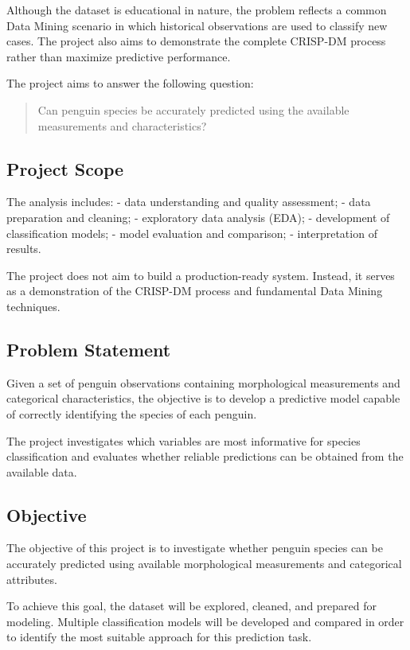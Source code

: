 \documentclass[
]{article}
\begin{document}
Although the dataset is educational in nature, the problem reflects a
common Data Mining scenario in which historical observations are used to
classify new cases. The project also aims to demonstrate the complete
CRISP-DM process rather than maximize predictive performance.

The project aims to answer the following question:

\begin{quote}
Can penguin species be accurately predicted using the available
measurements and characteristics?
\end{quote}

\subsection{Project Scope}\label{project-scope}

The analysis includes: - data understanding and quality assessment; -
data preparation and cleaning; - exploratory data analysis (EDA); -
development of classification models; - model evaluation and comparison;
- interpretation of results.

The project does not aim to build a production-ready system. Instead, it
serves as a demonstration of the CRISP-DM process and fundamental Data
Mining techniques.

\subsection{Problem Statement}\label{problem-statement}

Given a set of penguin observations containing morphological
measurements and categorical characteristics, the objective is to
develop a predictive model capable of correctly identifying the species
of each penguin.

The project investigates which variables are most informative for
species classification and evaluates whether reliable predictions can be
obtained from the available data.

\subsection{Objective}\label{objective}

The objective of this project is to investigate whether penguin species
can be accurately predicted using available morphological measurements
and categorical attributes.

To achieve this goal, the dataset will be explored, cleaned, and
prepared for modeling. Multiple classification models will be developed
and compared in order to identify the most suitable approach for this
prediction task.
\end{document}
